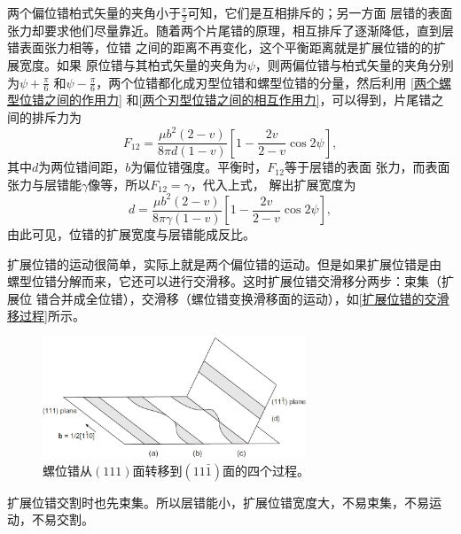                 两个偏位错柏式矢量的夹角小于$\frac{\pi}{2}$可知，它们是互相排斥的；另一方面
                层错的表面张力却要求他们尽量靠近。随着两个片尾错的原理，相互排斥了逐渐降低，直到层错表面张力相等，位错
                之间的距离不再变化，这个平衡距离就是扩展位错的的扩展宽度。如果
                原位错与其柏式矢量的夹角为$\psi$，则两偏位错与柏式矢量的夹角分别为$\psi+\frac{\pi}{6}$
                和$\psi-\frac{\pi}{6}$，两个位错都化成刃型位错和螺型位错的分量，然后利用 \autoref{两个螺型位错之间的作用力}
                和\autoref{两个刃型位错之间的相互作用力}，可以得到，片尾错之间的排斥力为
                \begin{equation}
                    F_{12}=\frac{\mu b^2(2-v)}{8\pi d(1-v)}\left[ 1-\frac{2v}{2-v}\cos{2\psi} \right],
                \end{equation}            
                其中$d$为两位错间距，$b$为偏位错强度。平衡时，$F_{12}$等于层错的表面
                张力，而表面张力与层错能$\gamma$像等，所以$F_{12}=\gamma$，代入上式，
                解出扩展宽度为
                \begin{equation}
                    d=\frac{\mu b^2(2-v)}{8\pi \gamma(1-v)}\left[ 1-\frac{2v}{2-v}\cos{2\psi} \right],
                \end{equation}
                由此可见，位错的扩展宽度与层错能成反比。

                扩展位错的运动很简单，实际上就是两个偏位错的运动。但是如果扩展位错是由
                螺型位错分解而来，它还可以进行交滑移。这时扩展位错交滑移分两步：束集（扩展位
                错合并成全位错），交滑移（螺位错变换滑移面的运动），如\autoref{扩展位错的交滑移过程}所示。
                \begin{figure}[ht]
                    \centering
                    \includegraphics[width=0.7\textwidth]{fig/Four_stages_in_the_cross_slip_of_a_dissociated_dislocation.jpg}
                    \caption{螺位错从$(111)$面转移到$(11\bar{1})$面的四个过程。}
                    \label{扩展位错的交滑移过程}
                \end{figure}
                扩展位错交割时也先束集。所以层错能小，扩展位错宽度大，不易束集，不易运
                动，不易交割。
